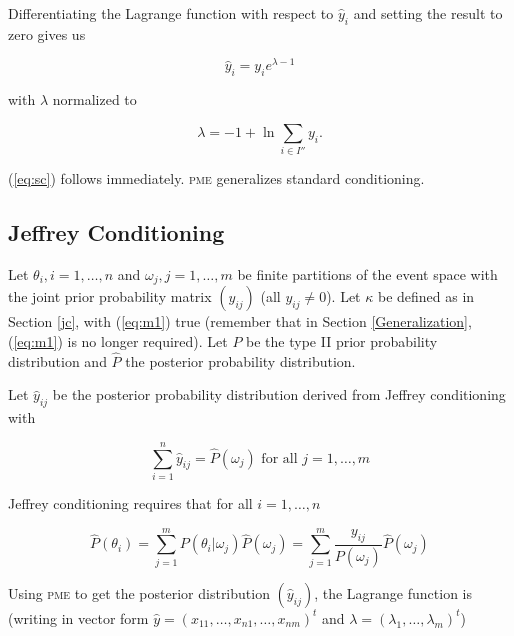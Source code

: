 \documentclass[entropy,article,submit,oneauthor,pdftex,12pt,a4paper]{mdpi}
\begin{document}
{\noindent}Differentiating the Lagrange function with respect to $\hat{y}_{i}$ and
setting the result to zero gives us

\begin{equation}
  \label{eq:sc1}
  \hat{y}_{i}=y_{i}e^{\lambda-1}
\end{equation}

{\noindent}with $\lambda$ normalized to

\begin{equation}
  \label{eq:sc2}
  \lambda=-1+\ln{}\sum_{i\in{}I''}y_{i}.
\end{equation}

{\noindent}(\ref{eq:sc}) follows immediately. \textsc{pme} generalizes standard conditioning.

\subsection{Jeffrey Conditioning}
\label{jco}

Let $\theta_{i},i=1,\ldots,n$ and $\omega_{j},j=1,\ldots,m$ be finite
partitions of the event space with the joint prior probability matrix
$(y_{ij})$ (all $y_{ij}\neq{}0$). Let $\kappa$ be defined as in
Section \ref{jc}, with (\ref{eq:m1}) true (remember that in Section
\ref{Generalization}, (\ref{eq:m1}) is no longer required). Let $P$ be
the type II prior probability distribution and $\hat{P}$ the posterior
probability distribution.

Let $\hat{y}_{ij}$ be the posterior probability distribution derived
from Jeffrey conditioning with

\begin{equation}
  \label{eq:jc1}
  \sum_{i=1}^{n}\hat{y}_{ij}=\hat{P}(\omega_{j})\mbox{ for all }j=1,\ldots,m
\end{equation}

{\noindent}Jeffrey conditioning requires that for all $i=1,\ldots,n$

\begin{equation}
  \label{eq:jc2}
  \hat{P}(\theta_{i})=\sum_{j=1}^{m}P(\theta_{i}|\omega_{j})\hat{P}(\omega_{j})=\sum_{j=1}^{m}\frac{y_{ij}}{P(\omega_{j})}\hat{P}(\omega_{j})
\end{equation}

{\noindent}Using \textsc{pme} to get the posterior distribution
$(\hat{y}_{ij})$, the Lagrange function is (writing in vector form
$\hat{y}=(x_{11},\ldots,x_{n1},\ldots,x_{nm})^{t}$ and
$\lambda=(\lambda_{1},\ldots,\lambda_{m})^{t}$)
\end{document}

